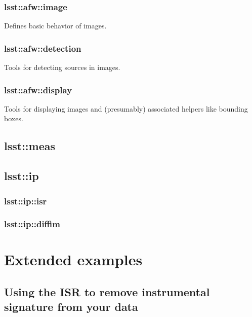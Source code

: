 \documentclass{book}
\begin{document}

\subsection{lsst::afw::image}

Defines basic behavior of images.

\subsection{lsst::afw::detection}

Tools for detecting sources in images.

\subsection{lsst::afw::display}

Tools for displaying images and (presumably) associated helpers like
bounding boxes.

\section{lsst::meas}

\section{lsst::ip}

\subsection{lsst::ip::isr}

\subsection{lsst::ip::diffim}




\chapter{Extended examples}

\section{Using the ISR to remove instrumental signature from your data}
\end{document}
